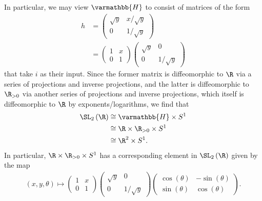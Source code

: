 \documentclass[10pt]{mypackage}
\renewcommand*{\mathbb}[1]{\varmathbb{#1}}
\begin{document}
\begin{solution}
  In particular, we may view $ \mathbb{H} $ to consist of matrices of the form
  \begin{align*}
    h &= \begin{pmatrix}\sqrt{y} & x/\sqrt{y} \\ 0 & 1/\sqrt{y}\end{pmatrix}\\
      &= \begin{pmatrix}1 & x \\ 0 & 1\end{pmatrix} \begin{pmatrix}\sqrt{y} & 0 \\ 0 & 1/\sqrt{y}\end{pmatrix}
  \end{align*}
  that take $i$ as their input. Since the former matrix is diffeomorphic to $\R$ via a series of projections and inverse projections, and the latter is diffeomorphic to $\R_{> 0}$ via another series of projections and inverse projections, which itself is diffeomorphic to $\R$ by exponents/logarithms, we find that
  \begin{align*}
    \SL_2\left( \R \right) &\cong \mathbb{H}\times S^{1}\\
                           &\cong \R\times \R_{> 0}\times S^{1}\\
                           &\cong \R^2\times S^{1}.
  \end{align*}
  In particular, $\R\times \R_{ > 0 }\times S^{1}$ has a corresponding element in $\SL_2\left( \R \right)$ given by the map 
  \begin{align*}
    \left( x,y,\theta \right) \mapsto \begin{pmatrix}1 & x \\ 0 & 1\end{pmatrix} \begin{pmatrix}\sqrt{y} & 0 \\ 0 & 1/\sqrt{y}\end{pmatrix} \begin{pmatrix}\cos\left( \theta \right) & -\sin\left( \theta \right)\\ \sin\left( \theta \right) & \cos\left( \theta \right)\end{pmatrix}.
  \end{align*}
\end{solution}
\end{document}

